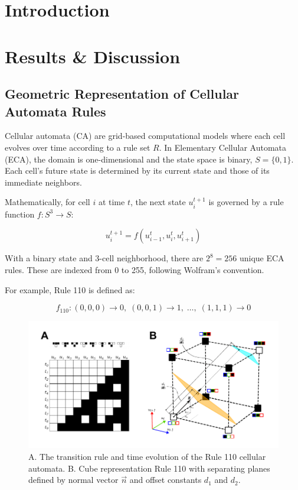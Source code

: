 \section{Introduction}
\label{sec:introduction}
\section{Results \& Discussion}
\subsection*{Geometric Representation of Cellular Automata Rules}

Cellular automata (CA) are grid-based computational models where each cell evolves over time according to a rule set \( R \). In Elementary Cellular Automata (ECA), the domain is one-dimensional and the state space is binary, \( S = \{0, 1\} \). Each cell's future state is determined by its current state and those of its immediate neighbors.

Mathematically, for cell \( i \) at time \( t \), the next state \( u_i^{t+1} \) is governed by a rule function \( f: S^3 \to S \):

\[
u_i^{t+1} = f(u_{i-1}^t, u_i^t, u_{i+1}^t)
\]

With a binary state and 3-cell neighborhood, there are \( 2^8 = 256 \) unique ECA rules. These are indexed from 0 to 255, following Wolfram's convention.

For example, Rule 110 is defined as:

\[
f_{\text{110}}: (0,0,0) \to 0, \; (0,0,1) \to 1, \; \ldots, \; (1,1,1) \to 0
\]




\begin{figure}[h]
    \centering
    \includegraphics[width=\textwidth]{images/SVGs/Cube.pdf}
    \caption{A. The transition rule and time evolution of the Rule 110 cellular automata. B. Cube representation Rule 110 with separating planes defined by normal vector $\overrightarrow{n}$ and offset constants $d_1$ and $d_2$. }
    \label{fig:cube}
\end{figure}

